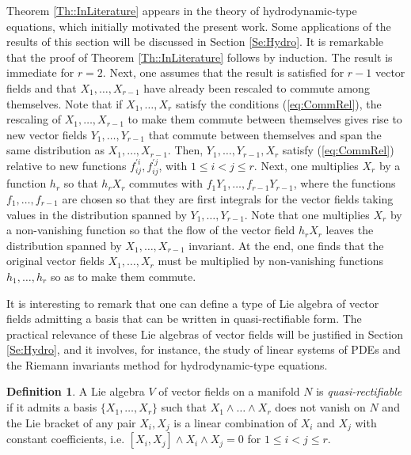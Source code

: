 \documentclass[12pt]{article}
\theoremstyle{plain}
\theoremstyle{definition}
\newtheorem{definition}[theorem]{Definition}
\numberwithin{equation}{section}
\begin{document}
Theorem \ref{Th::InLiterature} appears in the theory of hydrodynamic-type equations, which initially motivated the present work. Some applications of the results of this section will be discussed in Section \ref{Se:Hydro}. It is remarkable that the proof of Theorem \ref{Th::InLiterature} follows by induction. The result is immediate for $r=2$. Next, one assumes that the result is satisfied for $r-1$ vector fields and   that $X_1,\ldots,X_{r-1}$ have already been rescaled to commute among themselves. Note that if $X_1,\ldots,X_r$ satisfy the conditions (\ref{eq:CommRel}), the rescaling of $X_1,\ldots,X_{r-1}$ to make them commute between themselves gives rise to new vector fields $Y_1,\ldots,Y_{r-1}$ that commute between themselves and span the same distribution as $X_1,\ldots,X_{r-1}$. Then, $Y_1,\ldots,Y_{r-1},X_r$ satisfy (\ref{eq:CommRel}) relative to new functions $f_{ij}^{'i},f_{ij}^{'j}$, with $1\leq i< j\leq r$. Next, one multiplies $X_r$ by a function $h_r$ so that $h_rX_r$ commutes with $f_1Y_1,
\ldots,f_{r-1}Y_{r-1}$, where the functions $f_1,\ldots, f_{r-1}$ are chosen so that they are first integrals for the vector fields taking values in the distribution spanned by $Y_1,\ldots,Y_{r-1}$. Note that one multiplies $X_r$ by a non-vanishing function so that the flow of the vector field $h_rX_r$ leaves the distribution spanned by $X_1,\ldots,X_{r-1}$ invariant. At the end, one finds that the original vector fields $X_1,\ldots,X_r$ must be multiplied by non-vanishing functions $h_1,\ldots,h_r$ so as to make them commute.


It is interesting to remark that one can define a type of Lie algebra of vector fields admitting a basis that can be written in quasi-rectifiable form. The practical relevance of these Lie algebras of vector fields will be justified in Section \ref{Se:Hydro}, and it involves, for instance, the study of linear systems of PDEs and the Riemann invariants method for hydrodynamic-type equations. 

\begin{definition} A Lie algebra $V$ of vector fields on a manifold $N$ is \textit{quasi-rectifiable} if it admits a basis $
\{X_1,\ldots,X_r\}$ such that $X_1\wedge\ldots\wedge X_r$ does not vanish on $N$ and the Lie bracket of any pair $X_i,X_j$ is a linear combination of $X_i$ and $X_j$ with constant coefficients, i.e. $[X_i,X_j]\wedge X_i\wedge X_j=0$ for $1\leq i<j\leq r$.
\end{definition}
\end{document}
